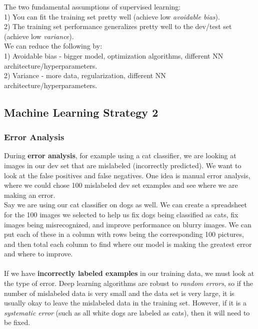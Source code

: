 \documentclass[11pt, a4paper]{article}
\begin{document}
\begin{spacing}{1.1}
	The two fundamental assumptions of supervised learning: \\
	\hspace*{3mm} 1) You can fit the training set pretty well (achieve low \textit{avoidable bias}). \\
	\hspace*{3mm} 2) The training set performance generalizes pretty well to the dev/test set (achieve low \textit{variance}). \vspace*{2mm}\\
	We can reduce the following by: \\
	\hspace*{3mm} 1) Avoidable bias - bigger model, optimization algorithms, different NN architecture/hyperparameters. \\
	\hspace*{3mm} 2) Variance - more data, regularization, different NN architecture/hyperparameters.
	
	\subsection{Machine Learning Strategy 2}
	\subsubsection{Error Analysis}
	During \textbf{error analysis}, for example using a cat classifier, we are looking at images in our dev set that are mislabeled (incorrectly predicted). We want to look at the false positives and false negatives. One idea is manual error analysis, where we could chose 100 mislabeled dev set examples and see where we are making an error. \vspace*{1mm} \\
	Say we are using our cat classifier on dogs as well. We can create a spreadsheet for the 100 images we selected to help us fix dogs being classified as cats, fix images being misrecognized, and improve performance on blurry images. We can put each of these in a column with rows being the corresponding 100 pictures, and then total each column to find where our model is making the greatest error and where to improve. \\~\\
	If we have \textbf{incorrectly labeled examples} in our training data, we must look at the type of error. Deep learning algorithms are robust to \textit{random errors}, so if the number of mislabeled data is very small and the data set is very large, it is usually okay to leave the mislabeled data in the training set. However, if it is a \textit{systematic error} (such as all white dogs are labeled as cats), then it will need to be fixed. \newpage


\end{spacing}
\end{document}
